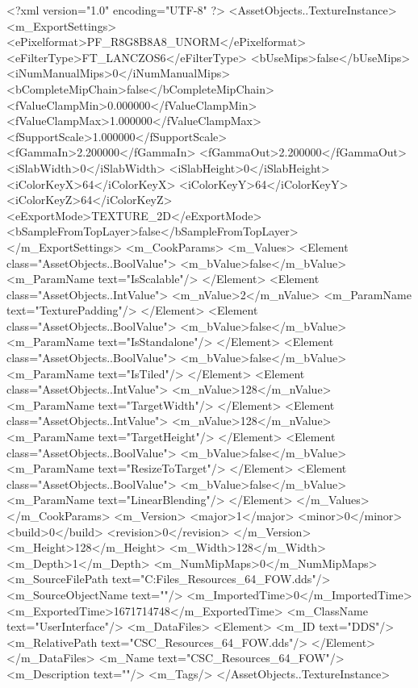 <?xml version="1.0" encoding="UTF-8" ?>
<AssetObjects..TextureInstance>
	<m_ExportSettings>
		<ePixelformat>PF_R8G8B8A8_UNORM</ePixelformat>
		<eFilterType>FT_LANCZOS6</eFilterType>
		<bUseMips>false</bUseMips>
		<iNumManualMips>0</iNumManualMips>
		<bCompleteMipChain>false</bCompleteMipChain>
		<fValueClampMin>0.000000</fValueClampMin>
		<fValueClampMax>1.000000</fValueClampMax>
		<fSupportScale>1.000000</fSupportScale>
		<fGammaIn>2.200000</fGammaIn>
		<fGammaOut>2.200000</fGammaOut>
		<iSlabWidth>0</iSlabWidth>
		<iSlabHeight>0</iSlabHeight>
		<iColorKeyX>64</iColorKeyX>
		<iColorKeyY>64</iColorKeyY>
		<iColorKeyZ>64</iColorKeyZ>
		<eExportMode>TEXTURE_2D</eExportMode>
		<bSampleFromTopLayer>false</bSampleFromTopLayer>
	</m_ExportSettings>
	<m_CookParams>
		<m_Values>
			<Element class="AssetObjects..BoolValue">
				<m_bValue>false</m_bValue>
				<m_ParamName text="IsScalable"/>
			</Element>
			<Element class="AssetObjects..IntValue">
				<m_nValue>2</m_nValue>
				<m_ParamName text="TexturePadding"/>
			</Element>
			<Element class="AssetObjects..BoolValue">
				<m_bValue>false</m_bValue>
				<m_ParamName text="IsStandalone"/>
			</Element>
			<Element class="AssetObjects..BoolValue">
				<m_bValue>false</m_bValue>
				<m_ParamName text="IsTiled"/>
			</Element>
			<Element class="AssetObjects..IntValue">
				<m_nValue>128</m_nValue>
				<m_ParamName text="TargetWidth"/>
			</Element>
			<Element class="AssetObjects..IntValue">
				<m_nValue>128</m_nValue>
				<m_ParamName text="TargetHeight"/>
			</Element>
			<Element class="AssetObjects..BoolValue">
				<m_bValue>false</m_bValue>
				<m_ParamName text="ResizeToTarget"/>
			</Element>
			<Element class="AssetObjects..BoolValue">
				<m_bValue>false</m_bValue>
				<m_ParamName text="LinearBlending"/>
			</Element>
		</m_Values>
	</m_CookParams>
	<m_Version>
		<major>1</major>
		<minor>0</minor>
		<build>0</build>
		<revision>0</revision>
	</m_Version>
	<m_Height>128</m_Height>
	<m_Width>128</m_Width>
	<m_Depth>1</m_Depth>
	<m_NumMipMaps>0</m_NumMipMaps>
	<m_SourceFilePath text="C:\Users\Shadow\Desktop\Working Files\Icons\Resources\CSC_Resources_64_FOW.dds"/>
	<m_SourceObjectName text=""/>
	<m_ImportedTime>0</m_ImportedTime>
	<m_ExportedTime>1671714748</m_ExportedTime>
	<m_ClassName text="UserInterface"/>
	<m_DataFiles>
		<Element>
			<m_ID text="DDS"/>
			<m_RelativePath text="CSC_Resources_64_FOW.dds"/>
		</Element>
	</m_DataFiles>
	<m_Name text="CSC_Resources_64_FOW"/>
	<m_Description text=""/>
	<m_Tags/>
</AssetObjects..TextureInstance>

